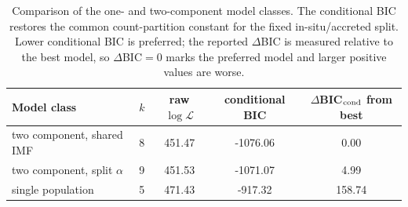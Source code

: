 \begin{table}
\caption{Comparison of the one- and two-component model classes. The conditional BIC restores the common count-partition constant for the fixed in-situ/accreted split. Lower conditional BIC is preferred; the reported $\Delta$BIC is measured relative to the best model, so $\Delta$BIC$=0$ marks the preferred model and larger positive values are worse.}
\label{tab:population_model_classes}
\small
\begin{tabular}{lcccc}
\hline
Model class & $k$ & raw $\log \mathcal{L}$ & conditional BIC & $\Delta$BIC$_{\rm cond}$ from best \\
\hline
two component, shared IMF & 8 & 451.47 & -1076.06 & 0.00 \\
two component, split $\alpha$ & 9 & 451.53 & -1071.07 & 4.99 \\
single population & 5 & 471.43 & -917.32 & 158.74 \\
\hline
\end{tabular}
\end{table}
